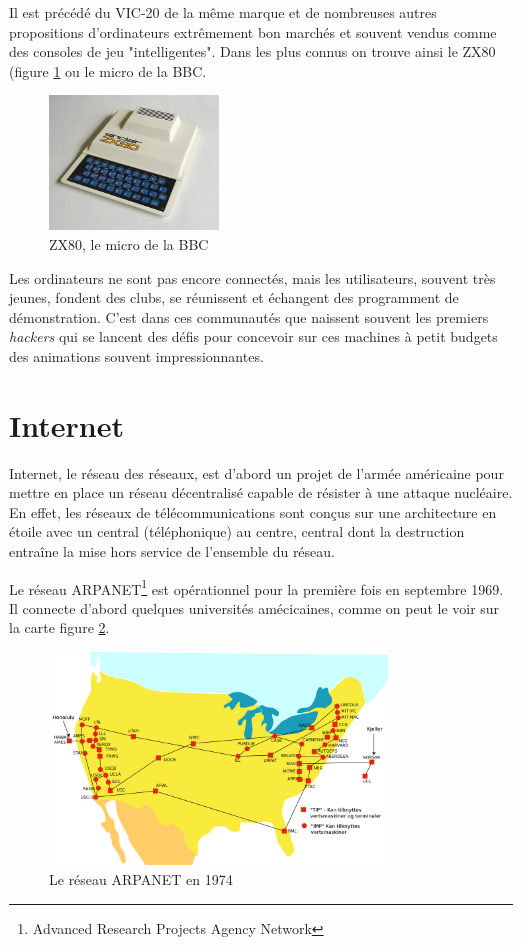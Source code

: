 \documentclass[a4paper,11pt]{book}
\begin{document}
Il est précédé du VIC-20 de la même marque et de nombreuses autres propositions d'ordinateurs extrêmement bon marchés et souvent vendus comme des consoles de jeu "intelligentes". Dans les plus connus on trouve ainsi le ZX80 (figure \ref{zx80} ou le micro de la BBC.

\begin{figure}[h]
    \centering
    \includegraphics[width=0.4\textwidth]{media/machines/520px-ZX80.jpeg}
    \caption{ZX80, le micro de la BBC}
    \label{zx80}
\end{figure}

Les ordinateurs ne sont pas encore connectés, mais les utilisateurs, souvent très jeunes, fondent des clubs, se réunissent et échangent des programment de démonstration. C'est dans ces communautés que naissent souvent les premiers \textit{hackers} qui se lancent des défis pour concevoir sur ces machines à petit budgets des animations souvent impressionnantes.

\section{Internet}

Internet, le réseau des réseaux, est d'abord un projet de l'armée américaine pour mettre en place un réseau décentralisé capable de résister à une attaque nucléaire. En effet, les réseaux de télécommunications sont conçus sur une architecture en étoile avec un central (téléphonique) au centre, central dont la destruction entraîne la mise hors service de l'ensemble du réseau. 

Le réseau ARPANET\footnote{Advanced Research Projects Agency Network} est opérationnel pour la première fois en septembre 1969. Il connecte d'abord quelques universités amécicaines, comme on peut le voir sur la carte figure \ref{arpanet}.

\begin{figure}[h]
    \centering
    \includegraphics[width=0.8\textwidth]{media/Arpanet_1974.svg.png}
    \caption{Le réseau ARPANET en 1974}
    \label{arpanet}
\end{figure}
\end{document}

